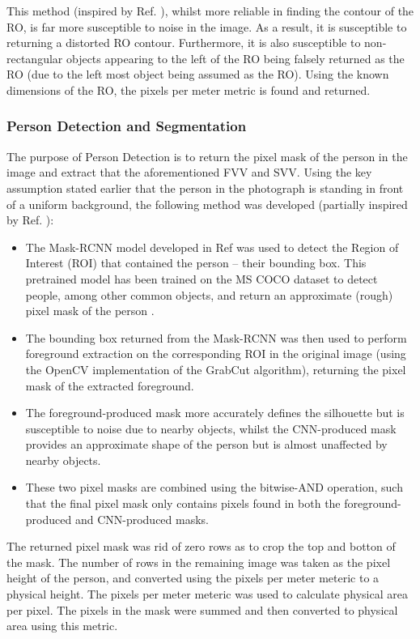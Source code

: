 \documentclass[conference]{IEEEtran}
\begin{document}
This method (inspired by Ref. \cite{objectDetection}), whilst more reliable in finding the contour of the RO, is far more susceptible to noise in the image.
As a result, it is susceptible to returning a distorted RO contour.
Furthermore, it is also susceptible to non-rectangular objects appearing to the left of the RO being falsely returned as the RO (due to the left most object being assumed as the RO).
Using the known dimensions of the RO, the pixels per meter metric is found and returned.

\subsubsection{Person Detection and Segmentation}
The purpose of Person Detection is to return the pixel mask of the person in the image and extract that the aforementioned FVV and SVV.
Using the key assumption stated earlier that the person in the photograph is standing in front of a uniform background, the following method was developed (partially inspired by Ref. \cite{maskrcnnDetection}):
\begin{itemize}
	\item The Mask-RCNN model developed in Ref \cite{maskrcnn} was used to detect the Region of Interest (ROI) that contained the person -- their bounding box.
	This pretrained model has been trained on the MS COCO dataset to detect people, among other common objects, and return an approximate (rough) pixel mask of the person \cite{mscoco}.
	\item The bounding box returned from the Mask-RCNN was then used to perform foreground extraction on the corresponding ROI in the original image (using the OpenCV implementation of the GrabCut algorithm), returning the pixel mask of the extracted foreground.
	\item The foreground-produced mask more accurately defines the silhouette but is susceptible to noise due to nearby objects, whilst the CNN-produced mask provides an approximate shape of the person but is almost unaffected by nearby objects.
	\item These two pixel masks are combined using the bitwise-AND operation, such that the final pixel mask only contains pixels found in both the foreground-produced and CNN-produced masks.
\end{itemize}
The returned pixel mask was rid of zero rows as to crop the top and botton of the mask.
The number of rows in the remaining image was taken as the pixel height of the person, and converted using the pixels per meter meteric to a physical height.
The pixels per meter meteric was used to calculate physical area per pixel.
The pixels in the mask were summed and then converted to physical area using this metric.
\end{document}
